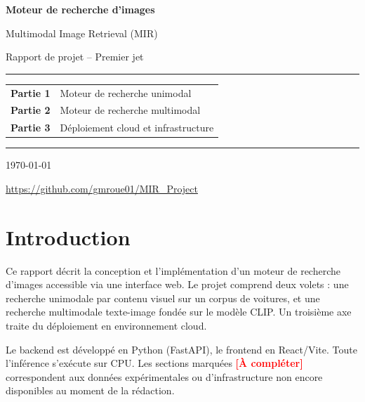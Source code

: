 \documentclass[12pt,a4paper]{report}
\begin{document}

\begin{titlepage}
  \centering\vspace*{2cm}
  {\Huge\bfseries Moteur de recherche d'images\par}
  \vspace{0.4cm}
  {\LARGE Multimodal Image Retrieval (MIR)\par}
  \vspace{1.5cm}
  {\large Rapport de projet -- Premier jet\par}
  \vspace{0.8cm}
  \rule{\textwidth}{0.5pt}\vspace{0.8cm}

  \begin{tabular}{ll}
    \textbf{Partie 1} & Moteur de recherche unimodal \\[3pt]
    \textbf{Partie 2} & Moteur de recherche multimodal \\[3pt]
    \textbf{Partie 3} & Déploiement cloud et infrastructure \\
  \end{tabular}

  \vspace{1.5cm}\rule{\textwidth}{0.5pt}\vspace{0.8cm}
  {\large \today\par}\vspace{0.5cm}
  {\normalsize \url{https://github.com/gmroue01/MIR_Project}\par}
  \vfill
\end{titlepage}

\tableofcontents\newpage

\chapter*{Introduction}

Ce rapport décrit la conception et l'implémentation d'un moteur de recherche d'images accessible via une interface web. Le projet comprend deux volets : une recherche unimodale par contenu visuel sur un corpus de voitures, et une recherche multimodale texte-image fondée sur le modèle CLIP. Un troisième axe traite du déploiement en environnement cloud.

Le backend est développé en Python (FastAPI), le frontend en React/Vite. Toute l'inférence s'exécute sur CPU. Les sections marquées \textcolor{red}{\textbf{[À compléter]}} correspondent aux données expérimentales ou d'infrastructure non encore disponibles au moment de la rédaction.
\end{document}
